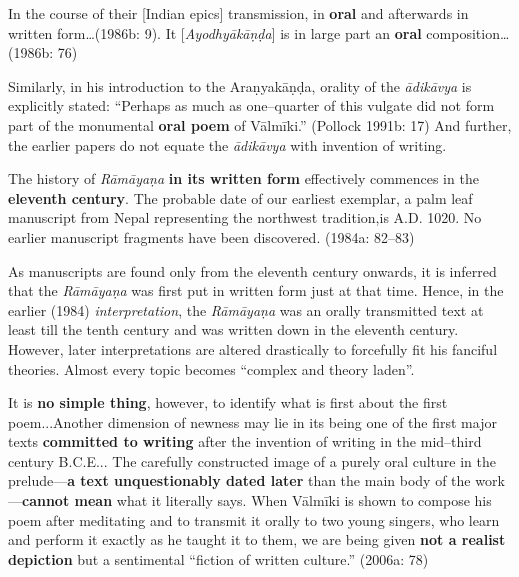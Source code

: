\begin{myquote}
In the course of their [Indian epics] transmission, in \textbf{oral} and afterwards in written form…(1986b: 9). It [\textit{Ayodhyākāṇḍa}] is in large part an \textbf{oral} composition…(1986b: 76)
\end{myquote}

Similarly, in his introduction to the Araṇyakāṇḍa, orality of the \textit{ādikāvya} is explicitly stated: “Perhaps as much as one–quarter of this vulgate did not form part of the monumental \textbf{oral poem} of Vālmīki.” (Pollock 1991b: 17) And further, the earlier papers do not equate the \textit{ādikāvya} with invention of writing.

\begin{myquote}
The history of \textit{Rāmāyaṇa }\textbf{in its written form} effectively commences in the \textbf{eleventh century}. The probable date of our earliest exemplar, a palm leaf manuscript from Nepal\; representing\; the northwest tradition,\newpage is A.D. 1020. No earlier manuscript fragments have been discovered. (1984a: 82–83)
\end{myquote}

As manuscripts are found only from the eleventh century onwards, it is inferred that the \textit{Rāmāyaṇa }was first put in written form just at that time. Hence, in the earlier (1984) \textit{interpretation}, the \textit{Rāmāyaṇa }was an orally transmitted text at least till the tenth century and was written down in the eleventh century. However, later interpretations are altered drastically to forcefully fit his fanciful theories. Almost every topic becomes “complex and theory laden”.

\begin{myquote}
It is \textbf{no simple thing}, however, to identify what is ﬁrst about the ﬁrst poem...Another dimension of newness may lie in its being one of the ﬁrst major texts \textbf{committed to writing} after the invention of writing in the mid–third century B.C.E... The carefully constructed image of a purely oral culture in the prelude—\textbf{a text unquestionably dated later} than the main body of the work—\textbf{cannot mean} what it literally says. When Vālmīki is shown to compose his poem after meditating and to transmit it orally to two young singers, who learn and perform it exactly as he taught it to them, we are being given\textbf{ not a realist depiction }but a sentimental “ﬁction of written culture.” (2006a: 78)
\end{myquote}

